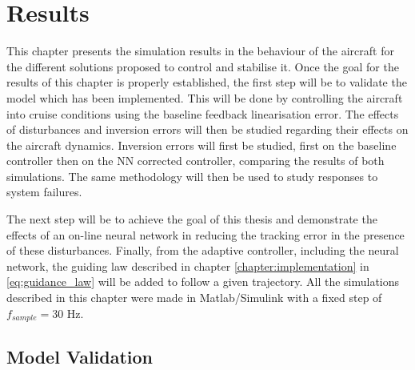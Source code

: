
\chapter{Results}
\label{chapter:results}

This chapter presents the simulation results in the behaviour of the aircraft for the different solutions proposed to control and stabilise it. Once the goal for the results of this chapter is properly established, the first step will be to validate the model which has been implemented. This will be done by controlling the aircraft into cruise conditions using the baseline feedback linearisation error. The effects of disturbances and inversion errors will then be studied regarding their effects on the aircraft dynamics. Inversion errors will first be studied, first on the baseline controller then on the NN corrected controller, comparing the results of both simulations. The same methodology will then be used to study responses to system failures.

The next step will be to achieve the goal of this thesis and demonstrate the effects of an on-line neural network in reducing the tracking error in the presence of these disturbances. Finally, from the adaptive controller, including the neural network, the guiding law described in chapter \ref{chapter:implementation} in \ref{eq:guidance_law} will be added to follow a given trajectory. 
All the simulations described in this chapter were made in Matlab/Simulink with a fixed step of $f_{sample} = 30$ Hz.


\section{Model Validation}
\label{section:results/validation}

